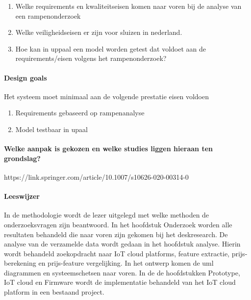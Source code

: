 \begin{enumerate}
	
	\item Welke requirements en kwaliteitseisen komen naar voren bij de analyse van een rampenonderzoek
	\item Welke veiligheidseisen er zijn voor sluizen in nederland. 
	\item Hoe kan in uppaal  een model worden getest dat voldoet aan de requirements/eisen volgens het rampenonderzoek?
\end{enumerate}



\paragraph{Design goals}
Het systeem moet minimaal aan de volgende prestatie eisen voldoen 

\begin{enumerate}
	\item   Requirements gebaseerd op rampenanalyse
	\item Model testbaar in upaal
\end{enumerate}

\paragraph{Welke aanpak is gekozen en welke studies liggen hieraan ten grondslag?}
https://link.springer.com/article/10.1007/s10626-020-00314-0

\paragraph{Leeswijzer}
In  de methodologie wordt de lezer uitgelegd met welke methoden de onderzoeksvragen zijn beantwoord. In het hoofdstuk Onderzoek worden alle resultaten behandeld die naar voren zijn gekomen bij het deskresearch. De analyse van de verzamelde data wordt gedaan in het hoofdstuk analyse. Hierin wordt behandeld zoekopdracht naar IoT cloud platforms, feature extractie, prijs-berekening en prijs-feature vergelijking. In het ontwerp komen de uml diagrammen en systeemschetsen naar voren. In de  de hoofdstukken Prototype, IoT cloud en Firmware wordt de implementatie behandeld van het IoT cloud platform in een bestaand project.




